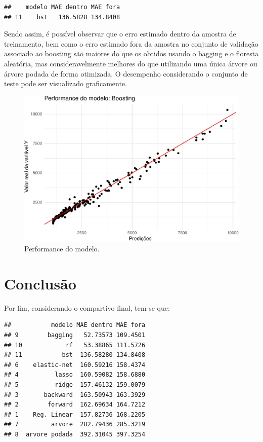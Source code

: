 \documentclass[11pt,]{article}
\begin{document}
\begin{verbatim}
##    modelo MAE dentro MAE fora
## 11    bst   136.5828 134.8408
\end{verbatim}

Sendo assim, é possível observar que o erro estimado dentro da amostra
de treinamento, bem como o erro estimado fora da amostra no conjunto de
validação associado ao boosting são maiores do que os obtidos usando o
bagging e o floresta aleatória, mas consideravelmente melhores do que
utilizando uma única árvore ou árvore podada de forma otimizada. O
desempenho considerando o conjunto de teste pode ser visualizado
graficamente.

\begin{figure}

{\centering \includegraphics[width=0.6\linewidth]{figs/unnamed-chunk-19} 

}

\caption{Performance do modelo.}\label{fig:unnamed-chunk-19}
\end{figure}

\hypertarget{conclusuxe3o}{%
\section{Conclusão}\label{conclusuxe3o}}

Por fim, considerando o compartivo final, tem-se que:

\begin{verbatim}
##           modelo MAE dentro MAE fora
## 9        bagging   52.73573 109.4501
## 10            rf   53.38865 111.5726
## 11           bst  136.58280 134.8408
## 6    elastic-net  160.59216 158.4374
## 4          lasso  160.59082 158.6880
## 5          ridge  157.46132 159.0079
## 3       backward  163.50943 163.3929
## 2        forward  162.69634 164.7212
## 1    Reg. Linear  157.82736 168.2205
## 7         arvore  282.79436 285.3219
## 8  arvore podada  392.31045 397.3254
\end{verbatim}
\end{document}
